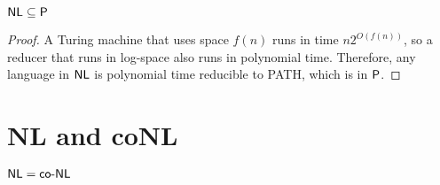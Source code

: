 \begin{corollary}
    $
    \mathsf{NL} \subseteq \mathsf{P}
    $
\end{corollary}

\begin{proof}
    A Turing machine that uses space $f(n)$ runs in time $n 2^{O(f(n))}$, so a reducer that runs in log-space also runs in polynomial time. Therefore, any language in $\mathsf{NL}$ is polynomial time reducible to PATH, which is in $\mathsf{P}$.
\end{proof}

\section{NL and coNL}

\vspace{\parskip}

\begin{theorem}
    $\mathsf{NL} = \mathsf{co}\text{-}\mathsf{NL}$
\end{theorem}